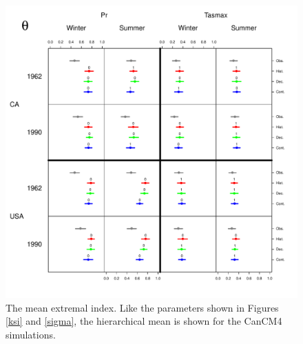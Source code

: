 \begin{figure}
\begin{center}
 \includegraphics[scale=0.61]{figs/theta.pdf}
\end{center}
\caption{The mean extremal index. Like the parameters shown in Figures \ref{ksi} and \ref{sigma}, the hierarchical mean is shown for the CanCM4 simulations.}
\label{theta}
\end{figure}

